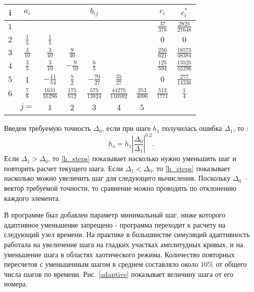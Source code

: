 \begin{tabular}{||c|c|c|c|c|c|c|c|c||}
\hline
i & $a_i$ & & & $b_{ij}$ & & & $c_i$ & $c_i^*$\\
\hline
$1$ & & & & & & & $\frac{37}{378}$ & $\frac{2825}{27648}$\\
\hline
$2$ & $\frac{1}{5}$ & $\frac{1}{5}$ & & & & & $0$ & $0$\\
\hline
$3$ & $\frac{3}{10}$ & $\frac{3}{40}$ & $\frac{9}{40}$ & & & & $\frac{250}{621}$ & $\frac{18575}{48384}$\\
\hline
$4$ & $\frac{3}{5}$ & $\frac{3}{10}$ & $-\frac{9}{10}$ & $\frac{6}{5}$ & & & $\frac{125}{594}$ & $\frac{13525}{55296}$\\
\hline
$5$ & 1 & $-\frac{11}{54}$ & $\frac{5}{2}$ & $-\frac{70}{27}$ & $\frac{35}{27}$ & & $0$ & $\frac{277}{14336}$\\
\hline
$6$ & $\frac{7}{8}$ & $\frac{1631}{55296}$ & $\frac{175}{512}$ & $\frac{575}{13824}$ & $\frac{44275}{110592}$ & $\frac{253}{4096}$ & $\frac{512}{1771}$ & $\frac{1}{4}$\\
\hline
& $j=$ & 1 & 2 & 3 & 4 & 5 & & \\
\hline
\end{tabular}

Введем требуемую точность $\Delta_0$, если при шаге $h_1$ получилась ошибка $\Delta_1$, то  \cite{Press2002}:
\begin{equation}\label{h_steps}
h_o=h_1\left|\frac{\Delta_0}{\Delta_1}\right|^{0.2}.
\end{equation}
Если $\Delta_1 > \Delta_0$, то \eqref{h_steps} показывает насколько нужно уменьшить шаг и повторить расчет текущего шага. Если $\Delta_1 < \Delta_0$, то \eqref{h_steps} показывает насколько можно увеличить шаг для следующего вычисления. Поскольку $\Delta_0$ -- вектор требуемой точности, то сравнение можно проводить по отклонению каждого элемента.


В программе был добавлен параметр минимальный шаг, ниже которого адаптивное уменьшение запрещено - программа переходит к расчету на следующий узел времени. На практике в большинстве симуляций адаптивность работала на увеличение шага на гладких участках амплитудных кривых, и на уменьшение шага в областях хаотического режима. Количество повторных пересчетов с уменьшенным шагом в среднем составляло около $10\%$ от общего числа шагов по времени. Рис. \ref{adaptive} показывает величину шага от его номера.

